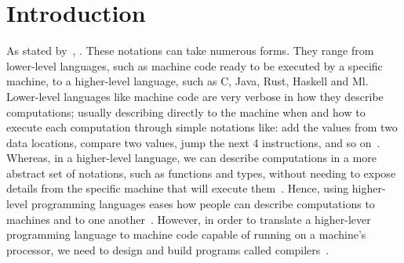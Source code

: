 \documentclass[
  oneside,
  english,
  coorientadorbanca,
  embeddedlogo,
  noabntexcite
]{ufsc-thesis-rn46-2019}
\begin{document}

\tableofcontents*

\textual{}

\chapter{Introduction}\label{chapter:introduction}

As stated by~\textcite{Aho:2006:CPT:1177220}, .
These notations can take numerous forms.
They range from lower-level languages, such as machine code ready to be executed by a specific machine, to a higher-level language, such as C, Java, Rust, Haskell and Ml.
Lower-level languages like machine code are very verbose in how they describe computations; usually describing directly to the machine when and how to execute each computation through simple notations like: add the values from two data locations, compare two values, jump the next 4 instructions, and so on~\cite{Aho:2006:CPT:1177220}.
Whereas, in a higher-level language, we can describe computations in a more abstract set of notations, such as functions and types, without needing to expose details from the specific machine that will execute them~\cite{Aho:2006:CPT:1177220}.
Hence, using higher-level programming languages eases how people can describe computations to machines and to one another~\cite{Aho:2006:CPT:1177220}.
However, in order to translate a higher-lever programming language to machine code capable of running on a machine's processor, we need to design and build programs called compilers~\cite{Aho:2006:CPT:1177220}.
\end{document}
